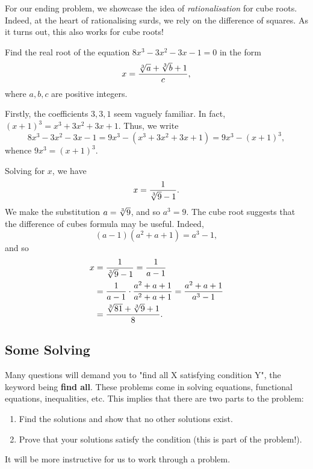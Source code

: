 \documentclass[../jarvis.tex]{subfiles}
\begin{document}
For our ending problem, we showcase the idea of \textit{rationalisation} for cube roots. Indeed, at the heart of rationalising surds, we rely on the difference of squares. As it turns out, this also works for cube roots! 
\begin{example}[2013 AIME II/5]
    Find the real root of the equation $8x^3-3x^2-3x-1=0$ in the form 
    $$x=\frac{\sqrt[3]{a}+\sqrt[3]{b}+1}{c},$$
    where $a,b,c$ are positive integers.
\end{example}
Firstly, the coefficients $3, 3, 1$ seem vaguely familiar. In fact, $(x+1)^3=x^3+3x^2+3x+1$. Thus, we write
$$8x^3-3x^2-3x-1=9x^3-(x^3+3x^2+3x+1)=9x^3-(x+1)^3,$$
whence $9x^3=(x+1)^3$.

Solving for $x$, we have $$x=\frac{1}{\sqrt[3]{9}-1}.$$ We make the substitution $a=\sqrt[3]{9}$, and so $a^3=9$. The cube root suggests that the difference of cubes formula may be useful. Indeed, $$(a-1)(a^2+a+1)=a^3-1,$$ and so
\begin{align*}
    x&=\frac{1}{\sqrt[3]{9}-1}=\frac{1}{a-1} \\
    &=\frac{1}{a-1}\cdot \frac{a^2+a+1}{a^2+a+1}=\frac{a^2+a+1}{a^3-1} \\
    &=\frac{\sqrt[3]{81}+\sqrt[3]{9}+1}{8}.
\end{align*}

\subsection{Some Solving}
Many questions will demand you to "find all X satisfying condition Y", the keyword being \textbf{find all}. These problems come in solving equations, functional equations, inequalities, etc. This implies that there are two parts to the problem: 
\begin{enumerate}
    \item Find the solutions and show that no other solutions exist.
    \item Prove that your solutions satisfy the condition (this is part of the problem!).
\end{enumerate}
It will be more instructive for us to work through a problem.
\end{document}
